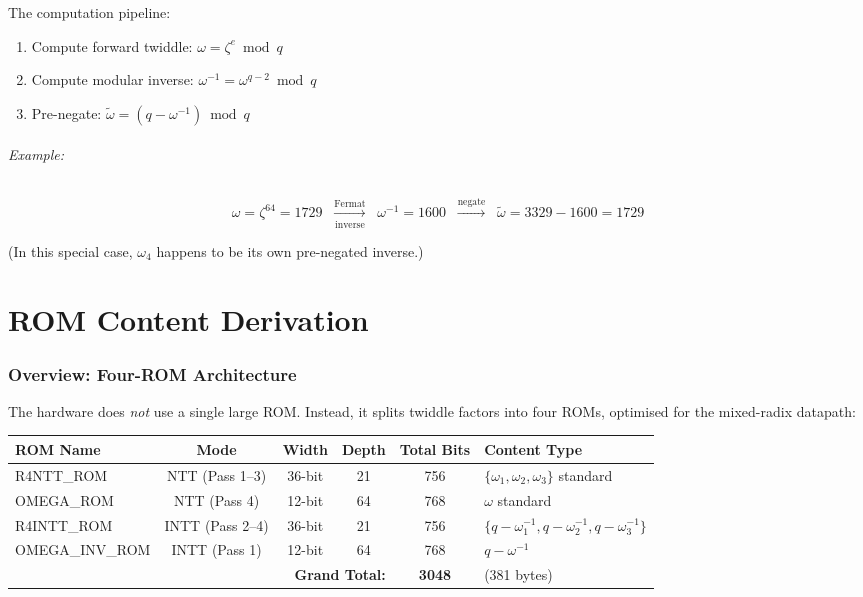 \documentclass[11pt,a4paper]{article}
\newcommand{\modneg}[1]{\widetilde{#1}}
\newcommand{\rom}[1]{\textsc{#1}}
\begin{document}
The computation pipeline:
\begin{enumerate}[label=\textbf{(\roman*)}]
  \item Compute forward twiddle: $\omega = \zeta^e \bmod q$
  \item Compute modular inverse: $\omega^{-1} = \omega^{q-2} \bmod q$
  \item Pre-negate: $\modneg{\omega} = (q - \omega^{-1}) \bmod q$
\end{enumerate}

\paragraph{Example:}
\[
  \omega = \zeta^{64} = 1729
  \;\;\xrightarrow[\text{inverse}]{\text{Fermat}}\;\;
  \omega^{-1} = 1600
  \;\;\xrightarrow{\text{negate}}\;\;
  \modneg{\omega} = 3329 - 1600 = 1729
\]

(In this special case, $\omega_4$ happens to be its own pre-negated inverse.)

\part{ROM Content Derivation}

\section{Overview: Four-ROM Architecture}
\label{sec:rom-overview}

The hardware does \emph{not} use a single large ROM. Instead, it splits twiddle factors into four ROMs, optimised for the mixed-radix datapath:

\begin{center}
\renewcommand{\arraystretch}{1.4}
\begin{tabular}{lccccl}
  \toprule
  \textbf{ROM Name} & \textbf{Mode} & \textbf{Width} & \textbf{Depth}
    & \textbf{Total Bits} & \textbf{Content Type} \\
  \midrule
  \rom{R4NTT\_ROM}     & NTT (Pass 1--3)  & 36-bit & 21 & 756
    & $\{\omega_1, \omega_2, \omega_3\}$ standard \\
  \rom{OMEGA\_ROM}     & NTT (Pass 4)     & 12-bit & 64 & 768
    & $\omega$ standard \\
  \rom{R4INTT\_ROM}    & INTT (Pass 2--4) & 36-bit & 21 & 756
    & $\{q\!-\!\omega_1^{-1}, q\!-\!\omega_2^{-1}, q\!-\!\omega_3^{-1}\}$ \\
  \rom{OMEGA\_INV\_ROM}& INTT (Pass 1)    & 12-bit & 64 & 768
    & $q - \omega^{-1}$ \\
  \midrule
  \multicolumn{4}{r}{\textbf{Grand Total:}} & \textbf{3048} & (381 bytes) \\
  \bottomrule
\end{tabular}
\end{center}
\end{document}
